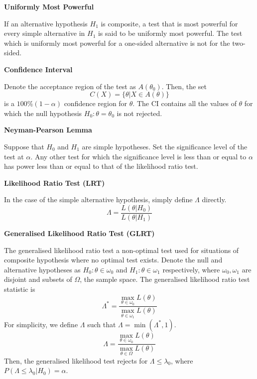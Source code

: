 \documentclass[a4paper]{article}
\newcommand{\subheading}[1]{{\scriptsize\textbf{#1}}}
\renewenvironment{section}[1]
  {
    \subheading{#1}

  }{
    \smallskip
  }
\begin{document}
\begin{multicols*}{4}
\begin{section}{Uniformly Most Powerful}
  If an alternative hypothesis $H_1$ is composite, a test that is most powerful
  for every simple alternative in $H_1$ is said to be uniformly most powerful.
  The test which is uniformly most powerful for a one-sided alternative is not
  for the two-sided.
\end{section}

\begin{section}{Confidence Interval}
  Denote the acceptance region of the test as $A(\theta_0)$. Then, the set
  $$C(X) = \{\theta | X \in A(\theta) \}$$
  is a $100\%(1-\alpha)$ confidence region for $\theta$. The CI contains all the
  values of $\theta$ for which the null hypothesis $H_0: \theta = \theta_0$ is
  not rejected.
\end{section}

\begin{section}{Neyman-Pearson Lemma}
  Suppose that $H_0$ and $H_1$ are simple hypotheses. Set the significance level
  of the test at $\alpha$. Any other test for which the significance level is
  less than or equal to $\alpha$ has power less than or equal to that of the
  likelihood ratio test.
\end{section}

\begin{section}{Likelihood Ratio Test (LRT)}
  In the case of the simple alternative hypothesis, simply define $\Lambda$
  directly.
  $$\Lambda = \frac{
    L(\theta | H_0)
  }{
    L(\theta | H_1)
  }$$
\end{section}

\begin{section}{Generalised Likelihood Ratio Test (GLRT)}
  The generalised likelihood ratio test a non-optimal test used for situations
  of composite hypothesis where no optimal test exists. Denote the null and
  alternative hypotheses as $H_0: \theta \in \omega_0$ and $H_1: \theta \in
  \omega_1$ respectively, where $\omega_0, \omega_1$ are disjoint and subsets of
  $\Omega$, the sample space. The generalised likelihood ratio test statistic is
  $$\Lambda^* = \frac{
    \max_{\theta \in \omega_0} L(\theta)
  }{
    \max_{\theta \in \omega_1} L(\theta)
  }$$
  For simplicity, we define $\Lambda$ such that $\Lambda = \min(\Lambda^*, 1)$.
  $$\Lambda = \frac{
    \max_{\theta \in \omega_0} L(\theta)
  }{
    \max_{\theta \in \Omega} L(\theta)
  }$$
  Then, the generalised likelihood test rejects for $\Lambda \leq \lambda_0$,
  where $P(\Lambda \leq \lambda_0 | H_0) = \alpha$.
\end{section}


\end{multicols*}
\end{document}
